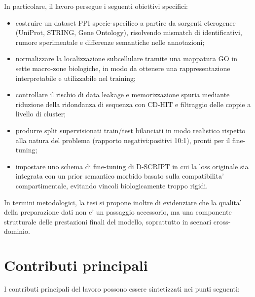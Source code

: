 \documentclass[12pt,a4paper,oneside]{report} %
\begin{document}
In particolare, il lavoro persegue i seguenti obiettivi specifici:
\begin{itemize}
    \item costruire un dataset PPI specie-specifico a partire da sorgenti eterogenee (UniProt, STRING, Gene Ontology), risolvendo mismatch di identificativi, rumore sperimentale e differenze semantiche nelle annotazioni;
    \item normalizzare la localizzazione subcellulare tramite una mappatura GO in sette macro-zone biologiche, in modo da ottenere una rappresentazione interpretabile e utilizzabile nel training;
    \item controllare il rischio di data leakage e memorizzazione spuria mediante riduzione della ridondanza di sequenza con CD-HIT e filtraggio delle coppie a livello di cluster;
    \item produrre split supervisionati train/test bilanciati in modo realistico rispetto alla natura del problema (rapporto negativi:positivi 10:1), pronti per il fine-tuning;
    \item impostare uno schema di fine-tuning di D-SCRIPT in cui la loss originale sia integrata con un prior semantico morbido basato sulla compatibilita' compartimentale, evitando vincoli biologicamente troppo rigidi.
\end{itemize}

In termini metodologici, la tesi si propone inoltre di evidenziare che la qualita' della preparazione dati non e' un passaggio accessorio, ma una componente strutturale delle prestazioni finali del modello, soprattutto in scenari cross-dominio.
\section{Contributi principali}
I contributi principali del lavoro possono essere sintetizzati nei punti seguenti:
\end{document}
